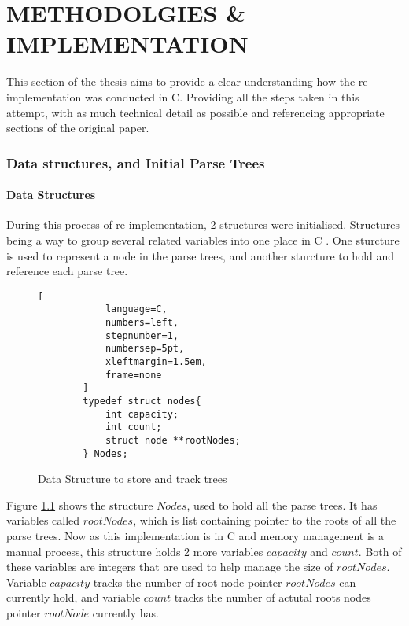 \chapter{METHODOLGIES \& IMPLEMENTATION}

This section of the thesis aims to provide a clear understanding how the re-implementation was conducted in C. Providing all the steps taken in this attempt, with as much technical detail as possible and referencing appropriate sections of the original paper.

\subsection{Data structures, and Initial Parse Trees}
\subsubsection{Data Structures}
During this process of re-implementation, 2 structures were initialised. Structures being a way to group several related variables into one place in C \cite{w3schoolStructuresStructs2025}. One sturcture is used to represent a node in the parse trees, and another sturcture to hold and reference each parse tree.
\begin{figure}[H]

    \begin{tcolorbox}[title=Nodes Structure for storing trees, colback=white, colframe=black]
        \begin{lstlisting}[
            language=C,
            numbers=left,
            stepnumber=1,
            numbersep=5pt,
            xleftmargin=1.5em,
            frame=none
        ]
        typedef struct nodes{
            int capacity;
            int count;
            struct node **rootNodes;
        } Nodes;
        \end{lstlisting}

    \end{tcolorbox}

\caption{Data Structure to store and track trees}
\label{fig:Data_Structures1}
\end{figure}

Figure \ref{fig:Data_Structures1} shows the structure $Nodes$, used to hold all the parse trees. It has variables called $rootNodes$, which is list containing pointer to the roots of all the parse trees. Now as this implementation is in C and memory management is a manual process, this structure holds 2 more variables $capacity$ and $count$. Both of these variables are integers that are used to help manage the size of $rootNodes$. Variable $capacity$ tracks the number of root node pointer $rootNodes$ can currently hold, and variable $count$ tracks the number of actutal roots nodes pointer $rootNode$ currently has.

